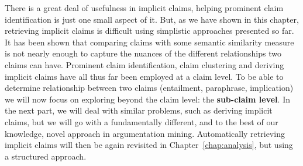 There is a great deal of usefulness in implicit claims, helping prominent claim
identification is just one small aspect of it. But, as we have shown in this chapter,
retrieving implicit claims is difficult using simplistic approaches presented
so far. It has been shown that comparing claims with some semantic similarity measure is not 
nearly enough to capture the nuances of the different relationships two claims can have.
Prominent claim identification, claim clustering and deriving implicit
claims have all thus far been employed at a claim level. To be able to 
determine relationship between two claims (entailment, paraphrase, implication)
we will now focus on exploring beyond the claim level: the \textbf{sub-claim level}. 
In the next part, we will deal with similar problems, such as deriving
implicit claims, but we will go with a fundamentally different, and to the best
of our knowledge, novel approach in argumentation mining. Automatically retrieving 
implicit claims will then be again revisited in 
Chapter~\ref{chap:analysis}, but using a structured approach.

